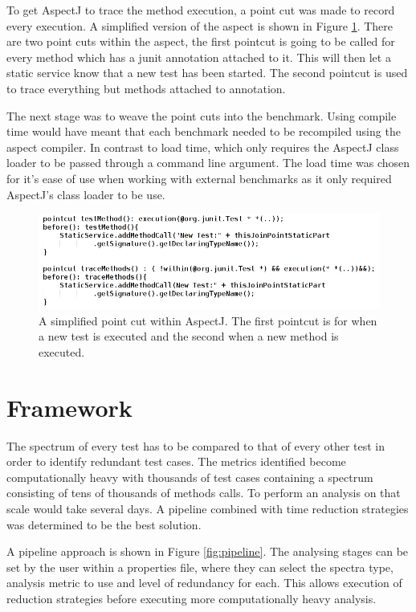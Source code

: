 To get AspectJ to trace the method execution, a point cut was made to record every execution. A simplified version of the aspect is shown in Figure \ref{fig:aspectused}. There are two point cuts within the aspect, the first pointcut is going to be called for every method which has a junit \@Test annotation attached to it. This will then let a static service know that a new test has been started. The second pointcut is used to trace everything but methods attached to \@Test annotation. 

The next stage was to weave the point cuts into the benchmark. Using compile time would have meant that each benchmark needed to be recompiled using the aspect compiler. In contrast to load time, which only requires the AspectJ class loader to be passed through a command line argument. The load time was chosen for it's ease of use when working with external benchmarks as it only required AspectJ's class loader to be use.

\begin{figure}[h]
\begin{center}
\includegraphics[width = \textwidth]{aspect.png}
\end{center}
\caption{A simplified point cut within AspectJ. The first pointcut is for when a new test is executed and the second when a new method is executed.}
\label{fig:aspectused}
\end{figure}

\section{Framework}
\label{S:framework}

The spectrum of every test has to be compared to that of every other test in order to identify redundant test cases. The metrics identified become computationally heavy with thousands of test cases containing a spectrum consisting of tens of thousands of methods calls. To perform an analysis on that scale would take several days. A pipeline combined with time reduction strategies was determined to be the best solution.

A pipeline approach is shown in Figure \ref{fig:pipeline}. The analysing stages can be set by the user within a properties file, where they can select the spectra type, analysis metric to use and level of redundancy for each. This allows execution of reduction strategies before executing more computationally heavy analysis.

